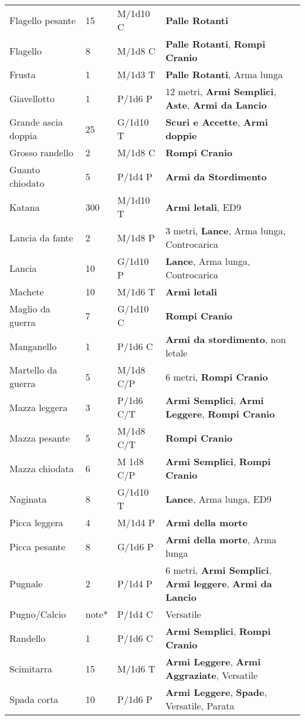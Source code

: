 \documentclass[a4paper,12 pt,openany]{book}
\begin{document}
\begin{textblock*}{19.5cm}
\begin{tabularx}{0.95\textwidth}{llll}
Flagello pesante& 15 & M/1d10 C& \textbf{Palle Rotanti}\\
Flagello& 8& M/1d8 C& \textbf{Palle Rotanti}, \textbf{Rompi Cranio}\\
Frusta& 1& M/1d3 T& \textbf{Palle Rotanti}, Arma lunga\\
Giavellotto& 1& P/1d6 P& 12 metri, \textbf{Armi Semplici}, \textbf{Aste}, \textbf{Armi da Lancio}\\
Grande ascia doppia& 25 & G/1d10 T& \textbf{Scuri e Accette}, \textbf{Armi doppie}\\
Grosso randello& 2& M/1d8 C&\textbf{Rompi Cranio}\\
Guanto chiodato& 5& P/1d4 P&\textbf{Armi da Stordimento}\\
Katana& 300& M/1d10 T& \textbf{Armi letali}, ED9\\
Lancia da fante& 2& M/1d8 P&3 metri, \textbf{Lance}, Arma lunga, Controcarica\\
Lancia& 10 & G/1d10 P&\textbf{Lance}, Arma lunga, Controcarica\\
Machete& 10 & M/1d6 T&\textbf{Armi letali}\\
Maglio da guerra& 7& G/1d10 C& \textbf{Rompi Cranio}\\
Manganello& 1& P/1d6 C& \textbf{Armi da stordimento}, non letale\\
Martello da guerra& 5& M/1d8 C/P& 6 metri, \textbf{Rompi Cranio}\\
Mazza leggera& 3& P/1d6 C/T& \textbf{Armi Semplici}, \textbf{Armi Leggere}, \textbf{Rompi Cranio} \\
Mazza pesante& 5& M/1d8 C/T& \textbf{Rompi Cranio}\\
Mazza chiodata& 6& M 1d8 C/P& \textbf{Armi Semplici}, \textbf{Rompi Cranio}\\
Naginata& 8& G/1d10 T&\textbf{Lance}, Arma lunga, ED9\\
Picca leggera& 4& M/1d4 P&\textbf{Armi della morte}\\
Picca pesante& 8& G/1d6 P&\textbf{Armi della morte}, Arma lunga\\
Pugnale& 2& P/1d4 P& 6 metri, \textbf{Armi Semplici}, \textbf{Armi leggere}, \textbf{Armi da Lancio}\\
Pugno/Calcio & note*& P/1d4 C&Versatile\\
Randello& 1& P/1d6 C& \textbf{Armi Semplici}, \textbf{Rompi Cranio}\\
Scimitarra& 15 & M/1d6 T&\textbf{Armi Leggere}, \textbf{Armi Aggraziate}, Versatile\\
Spada corta& 10 & P/1d6 P&\textbf{Armi Leggere}, \textbf{Spade}, Versatile, Parata\\

\end{tabularx}
\end{textblock*}
\end{document}

